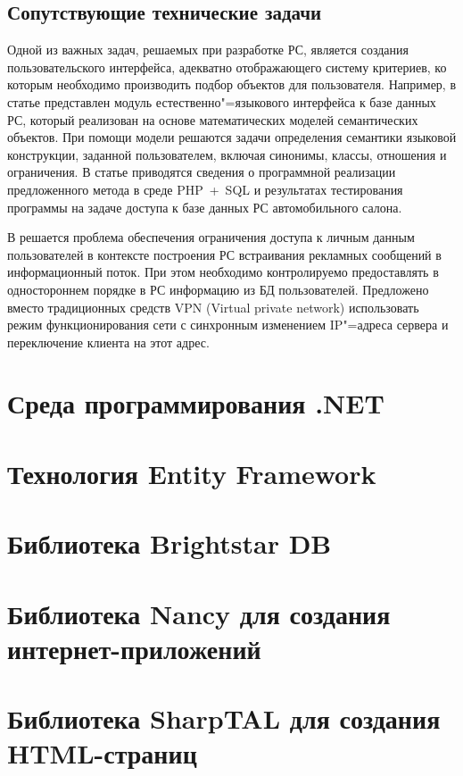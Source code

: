 \documentclass[a4paper,14pt,openany,final]{extreport} %
\begin{document}
\subsection{Сопутствующие технические задачи}
\label{sec:co-tasks}

Одной из важных задач, решаемых при разработке РС, является создания пользовательского интерфейса, адекватно отображающего систему критериев, ко которым необходимо производить подбор объектов для пользователя. Например, в статье \cite{b14} представлен модуль естественно"=языкового интерфейса к базе данных РС, который реализован на основе математических моделей семантических объектов. При помощи модели решаются задачи определения семантики языковой конструкции, заданной пользователем, включая синонимы, классы, отношения и ограничения. В статье приводятся сведения о программной реализации предложенного метода в среде PHP~+~SQL и результатах тестирования программы на задаче доступа к базе данных РС автомобильного салона.

В \cite{b15} решается проблема обеспечения ограничения доступа к личным данным пользователей в контексте построения РС встраивания рекламных сообщений в информационный поток. При этом необходимо контролируемо предоставлять в одностороннем порядке в РС информацию из БД пользователей. Предложено вместо традиционных средств VPN (\foreignlanguage{english}{Virtual private network}) использовать режим функционирования сети с синхронным изменением IP"=адреса сервера и переключение клиента на этот адрес.

\section{Среда программирования .NET}
\section{Технология Entity Framework}
\section{Библиотека Brightstar DB}
\section{Библиотека Nancy для создания интернет-приложений}
\section{Библиотека SharpTAL для создания HTML-страниц}
\end{document}
